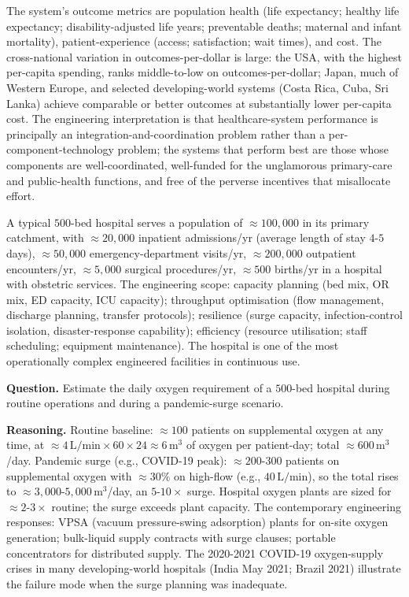 The system's outcome metrics are population health (life expectancy; healthy life expectancy; disability-adjusted life years; preventable deaths; maternal and infant mortality), patient-experience (access; satisfaction; wait times), and cost. The cross-national variation in outcomes-per-dollar is large: the USA, with the highest per-capita spending, ranks middle-to-low on outcomes-per-dollar; Japan, much of Western Europe, and selected developing-world systems (Costa Rica, Cuba, Sri Lanka) achieve comparable or better outcomes at substantially lower per-capita cost. The engineering interpretation is that healthcare-system performance is principally an integration-and-coordination problem rather than a per-component-technology problem; the systems that perform best are those whose components are well-coordinated, well-funded for the unglamorous primary-care and public-health functions, and free of the perverse incentives that misallocate effort.

\begin{archetype}
A typical $500$-bed hospital serves a population of $\approx 100{,}000$ in its primary catchment, with $\approx 20{,}000$ inpatient admissions/yr (average length of stay $4$-$5$ days), $\approx 50{,}000$ emergency-department visits/yr, $\approx 200{,}000$ outpatient encounters/yr, $\approx 5{,}000$ surgical procedures/yr, $\approx 500$ births/yr in a hospital with obstetric services. The engineering scope: capacity planning (bed mix, OR mix, ED capacity, ICU capacity); throughput optimisation (flow management, discharge planning, transfer protocols); resilience (surge capacity, infection-control isolation, disaster-response capability); efficiency (resource utilisation; staff scheduling; equipment maintenance). The hospital is one of the most operationally complex engineered facilities in continuous use.
\end{archetype}

\begin{estimation}
\textbf{Question.} Estimate the daily oxygen requirement of a $500$-bed hospital during routine operations and during a pandemic-surge scenario.

\textbf{Reasoning.} Routine baseline: $\approx 100$ patients on supplemental oxygen at any time, at $\approx 4\,\text{L/min} \times 60 \times 24 \approx 6\,\text{m}^3$ of oxygen per patient-day; total $\approx 600\,\text{m}^3$/day. Pandemic surge (e.g., COVID-19 peak): $\approx 200$-$300$ patients on supplemental oxygen with $\approx 30\%$ on high-flow (e.g., $40\,\text{L/min}$), so the total rises to $\approx 3{,}000$-$5{,}000\,\text{m}^3$/day, an $5$-$10\times$ surge. Hospital oxygen plants are sized for $\approx 2$-$3\times$ routine; the surge exceeds plant capacity. The contemporary engineering responses: VPSA (vacuum pressure-swing adsorption) plants for on-site oxygen generation; bulk-liquid supply contracts with surge clauses; portable concentrators for distributed supply. The 2020-2021 COVID-19 oxygen-supply crises in many developing-world hospitals (India May 2021; Brazil 2021) illustrate the failure mode when the surge planning was inadequate.
\end{estimation}

